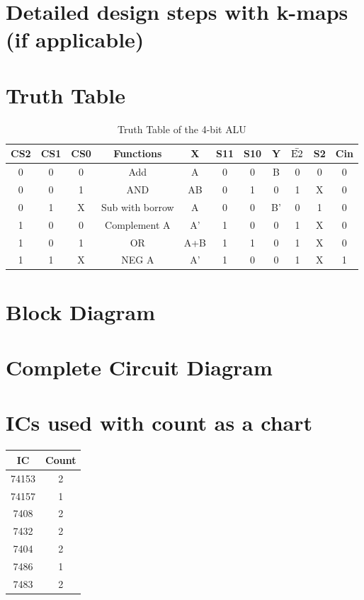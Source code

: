 \documentclass[11pt]{article}
\begin{document}
\section{Detailed design steps with k-maps (if applicable)}

\section{Truth Table}
\begin{table}[ht]
    \centering
    \begin{tabular}{|c|c|c|c|c|c|c|c|c|c|c|}
        \hline
        CS2 & CS1 & CS0 & Functions & X & S11 & S10 & Y & $\bar{\textnormal{E2}}$ & S2 & Cin \\
        \hline
        0 & 0 & 0 & Add & A & 0 & 0 & B & 0 & 0 & 0 \\
        \hline
        0 & 0 & 1 & AND & AB & 0 & 1 & 0 & 1 & X & 0 \\
        \hline
        0 & 1 & X & Sub with borrow & A & 0 & 0 & B' & 0 & 1 & 0 \\
        \hline
        1 & 0 & 0 & Complement A & A' & 1 & 0 & 0 & 1 & X & 0 \\
        \hline
        1 & 0 & 1 & OR & A+B & 1 & 1 & 0 & 1 & X & 0 \\
        \hline
        1 & 1 & X & NEG A & A' & 1 & 0 & 0 & 1 & X & 1 \\
        \hline
    \end{tabular}
    \caption{Truth Table of the 4-bit ALU}
\end{table}

\section{Block Diagram}

\section{Complete Circuit Diagram}

\section{ICs used with count as a chart}
\begin{table}[ht]
    \centering
    \begin{tabular}{|c|c|}
        \hline
        IC & Count \\
        \hline
        74153 & 2 \\
        \hline
        74157 & 1 \\
        \hline
        7408 & 2 \\
        \hline
        7432 & 2 \\
        \hline
        7404 & 2 \\
        \hline
        7486 & 1 \\
        \hline
        7483 & 2 \\
        \hline
    \end{tabular}
\end{table}
\end{document}
